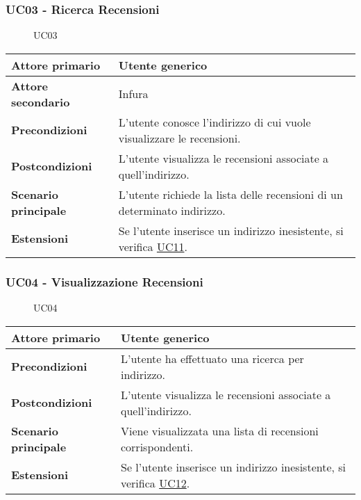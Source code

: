 \subsubsection{UC03 - Ricerca Recensioni}
\label{UC03}

\begin{figure}[H]
    \centering
    
    \caption{UC03}
 \end{figure}

\begin{center}
\renewcommand{\arraystretch}{1.5}
\begin{tabular}{ | m{10em} | m{20em} | }
    \hline
    \textbf{Attore primario} & Utente generico \\
    \hline
    \textbf{Attore secondario} & Infura \\
    \hline
    \textbf{Precondizioni} & L'utente conosce l'indirizzo di cui vuole visualizzare le recensioni. \\
    \hline
    \textbf{Postcondizioni} & L'utente visualizza le recensioni associate a quell'indirizzo. \\
    \hline
    \textbf{Scenario principale} & L'utente richiede la lista delle recensioni di un determinato indirizzo. \\
    \hline
    \textbf{Estensioni} & Se l'utente inserisce un indirizzo inesistente, si verifica \hyperref[UC11]{UC11}. \\
    \hline
   \end{tabular}
\end{center}

\subsubsection{UC04 - Visualizzazione Recensioni}
\label{UC04}

\begin{figure}[H]
    \centering
    
    \caption{UC04}
 \end{figure}
\begin{center}
\renewcommand{\arraystretch}{1.5}
\begin{tabular}{ | m{10em} | m{20em} | }
    \hline
    \textbf{Attore primario} & Utente generico \\
    \hline
    \textbf{Precondizioni} & L'utente ha effettuato una ricerca per indirizzo. \\
    \hline
    \textbf{Postcondizioni} & L'utente visualizza le recensioni associate a quell'indirizzo. \\
    \hline
    \textbf{Scenario principale} & Viene visualizzata una lista di recensioni corrispondenti. \\
    \hline
    \textbf{Estensioni} & Se l'utente inserisce un indirizzo inesistente, si verifica \hyperref[UC12]{UC12}. \\
    \hline
   \end{tabular}
\end{center}

